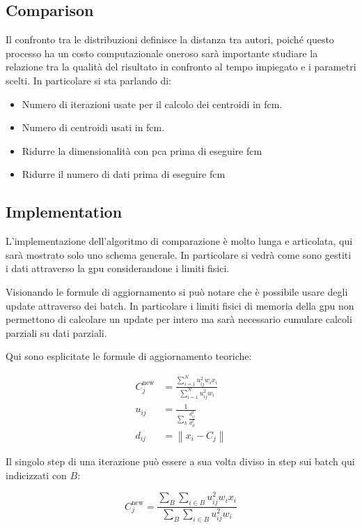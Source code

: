 \begin{toDo}
    \section{Comparison}
    Il confronto tra le distribuzioni definisce la distanza tra autori, poiché questo processo ha un costo computazionale oneroso sarà importante studiare la relazione tra la qualità del risultato in confronto al tempo impiegato e i parametri scelti. In particolare si sta parlando di:
    \begin{itemize}
    	\item Numero di iterazioni usate per il calcolo dei centroidi in \gls{fcm}.
    	\item Numero di centroidi usati in \gls{fcm}.
    	\item Ridurre la dimensionalità con \gls{pca} prima di eseguire \gls{fcm}
    	\item Ridurre il numero di dati prima di eseguire \gls{fcm}
    \end{itemize}

	\subsection{Implementation}
	L'implementazione dell'algoritmo di comparazione è molto lunga e articolata, qui sarà mostrato solo uno schema generale. In particolare si vedrà come sono gestiti i dati attraverso la \gls{gpu} considerandone i limiti fisici.


	\noindent Visionando le formule di aggiornamento si può notare che è possibile usare degli update attraverso dei batch. In particolare i limiti fisici di memoria della \gls{gpu} non permettono di calcolare un update per intero ma sarà necessario cumulare calcoli parziali su dati parziali.

	\noindent Qui sono esplicitate le formule di aggiornamento teoriche:

	\begin{align*}
		C_{j}^\text{new} &= \frac{\sum_{i=1}^N u_{ij}^2w_ix_i}{\sum_{i=1}^N u_{ij}^2w_i} \\
		u_{ij} &= \frac{1}{\sum_k\frac{d_{ij}^2}{d_{ik}^2}} \\
		d_{ij} &= \left\|x_i - C_{j}\right\|
	\end{align*}

	\noindent Il singolo step di una iterazione può essere a sua volta diviso in step sui batch qui indicizzati con $B$:

	\begin{equation*}
		C_{j}^\text{new} = \frac{\sum_{B}\sum_{i\in B} u_{ij}^2w_ix_i}{\sum_{B}\sum_{i\in B} u_{ij}^2w_i}
	\end{equation*}


\end{toDo}
